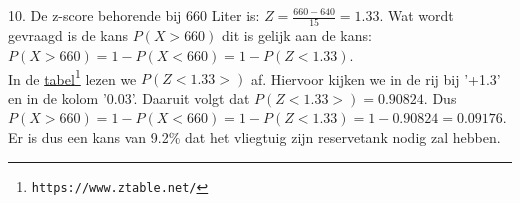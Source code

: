 10. De z-score behorende bij 660 Liter is: $Z=\frac{660-640}{15} = 1.33$. Wat wordt gevraagd is de kans $P(X>660)$ dit is gelijk aan de kans:
$P(X>660)= 1-P(X< 660) = 1-P(Z<1.33)$.\\
In de \href{https://www.ztable.net/}{\color{blue}tabel}\footnote{\texttt{https://www.ztable.net/}} lezen we $P(Z<1.33>)$ af. Hiervoor kijken we in de rij bij '+1.3' en in de kolom '0.03'. Daaruit volgt dat
$P(Z<1.33>) = 0.90824$. Dus 
$P(X>660) = 1-P(X< 660) = 1-P(Z<1.33) = 1-0.90824 = 0.09176$.\\
Er is dus een kans van 9.2\% dat het vliegtuig zijn reservetank nodig zal hebben.







